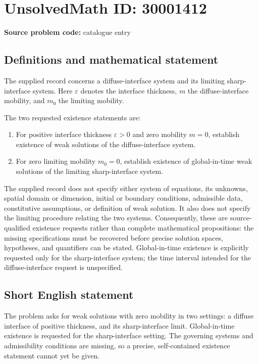 \documentclass[11pt]{article}
\begin{document}
\section*{UnsolvedMath ID: 30001412}
\textbf{Source problem code:} catalogue entry
\subsection{Definitions and mathematical statement}
The supplied record concerns a diffuse-interface system and its limiting sharp-interface system. Here \(\varepsilon\) denotes the interface thickness, \(m\) the diffuse-interface mobility, and \(m_0\) the limiting mobility.

The two requested existence statements are:
\begin{enumerate}
\item For positive interface thickness \(\varepsilon>0\) and zero mobility \(m=0\), establish existence of weak solutions of the diffuse-interface system.
\item For zero limiting mobility \(m_0=0\), establish existence of global-in-time weak solutions of the limiting sharp-interface system.
\end{enumerate}
The supplied record does not specify either system of equations, its unknowns, spatial domain or dimension, initial or boundary conditions, admissible data, constitutive assumptions, or definition of weak solution. It also does not specify the limiting procedure relating the two systems. Consequently, these are source-qualified existence requests rather than complete mathematical propositions: the missing specifications must be recovered before precise solution spaces, hypotheses, and quantifiers can be stated. Global-in-time existence is explicitly requested only for the sharp-interface system; the time interval intended for the diffuse-interface request is unspecified.
\subsection{Short English statement}
The problem asks for weak solutions with zero mobility in two settings: a diffuse interface of positive thickness, and its sharp-interface limit. Global-in-time existence is requested for the sharp-interface setting. The governing systems and admissibility conditions are missing, so a precise, self-contained existence statement cannot yet be given.
\end{document}

